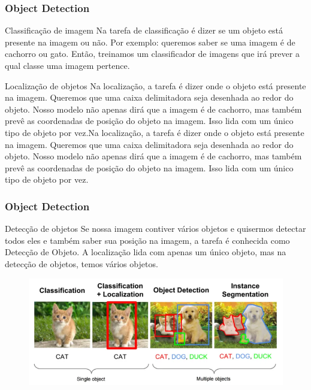 \documentclass{beamer}
\begin{document}
\begin{frame}
	\frametitle{Object Detection}
	\begin{block}{Classificação de imagem}
		Na tarefa de classificação é dizer se um objeto está presente na imagem ou não. Por exemplo: queremos saber se uma imagem é de cachorro ou gato. Então, treinamos um classificador de imagens que irá prever a qual classe uma imagem pertence.
	\end{block}
	\begin{block}{Localização de objetos}
		Na localização, a tarefa é dizer onde o objeto está presente na imagem. Queremos que uma caixa delimitadora seja desenhada ao redor do objeto. Nosso modelo não apenas dirá que a imagem é de cachorro, mas também prevê as coordenadas de posição do objeto na imagem. Isso lida com um único tipo de objeto por vez.Na localização, a tarefa é dizer onde o objeto está presente na imagem. Queremos que uma caixa delimitadora seja desenhada ao redor do objeto. Nosso modelo não apenas dirá que a imagem é de cachorro, mas também prevê as coordenadas de posição do objeto na imagem. Isso lida com um único tipo de objeto por vez.
	\end{block}
\end{frame}


\begin{frame}
	\frametitle{Object Detection}
	\begin{block}{Detecção de objetos}
		Se nossa imagem contiver vários objetos e quisermos detectar todos eles e também saber sua posição na imagem, a tarefa é conhecida como Detecção de Objeto. A localização lida com apenas um único objeto, mas na detecção de objetos, temos vários objetos.
	\end{block}
	\begin{figure}
		\centering
		\includegraphics[width=0.7\linewidth]{figures/comparing_object_detection}
	\end{figure}

\end{frame}
\end{document}
